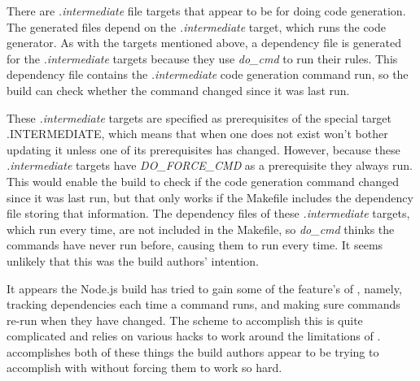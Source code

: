 





There are \emph{.intermediate} file targets that appear to be for doing code generation.  The generated files depend on the \emph{.intermediate} target, which runs the code generator.  As with the targets mentioned above, a dependency file is generated for the \emph{.intermediate} targets because they use \emph{do\_cmd} to run their rules.  This dependency file contains the \emph{.intermediate} code generation command run, so the build can check whether the command changed since it was last run.

These \emph{.intermediate} targets are specified as prerequisites of the special \Make target {.INTERMEDIATE}, which means that when one does not exist \Make won't bother updating it unless one of its prerequisites has changed.  However, because these \emph{.intermediate} targets have \emph{DO\_FORCE\_CMD} as a prerequisite they always run.  This would enable the build to check if the code generation command changed since it was last run, but that only works if the Makefile includes the dependency file storing that information.  The dependency files of these \emph{.intermediate} targets, which run every time, are not included in the Makefile, so \emph{do\_cmd} thinks the commands have never run before, causing them to run every time.  It seems unlikely that this was the build authors' intention.

It appears the Node.js build has tried to gain some of the feature's of \Rattle, namely, tracking dependencies each time a command runs, and making sure commands re-run when they have changed.  The scheme to accomplish this is quite complicated and relies on various hacks to work around the limitations of \Make.  \Rattle accomplishes both of these things the build authors appear to be trying to accomplish with \Make without forcing them to work so hard.

